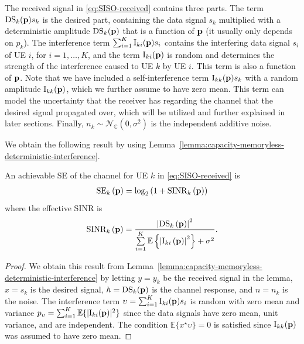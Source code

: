 The received signal in \eqref{eq:SISO-received} contains three parts. The term $\mathrm{DS}_k(\mathbf{p})s_k$ is the desired part, containing the data signal $s_k$ multiplied with a deterministic amplitude $\mathrm{DS}_k(\mathbf{p})$ that is a function of $\mathbf{p}$ (it usually only depends on $p_k$). The interference term $\sum_{i=1}^K\mathrm{I}_{ki}(\mathbf{p})s_i$ contains the interfering data signal $s_i$ of UE $i$, for $i=1,\ldots,K$, and the term $\mathrm{I}_{ki}(\mathbf{p})$ is random and determines the strength of the interference caused to UE $k$ by UE $i$. This term is also a function of $\mathbf{p}$. Note that we have included a self-interference term $\mathrm{I}_{kk} (\mathbf{p})s_k$ with a random amplitude $\mathrm{I}_{kk}(\mathbf{p})$, which we further assume to have zero mean. This term can model the uncertainty that the receiver has regarding the channel that the desired signal propagated over, which will be utilized and further explained in later sections. Finally, $n_k \sim \mathcal{N}_{\mathbb{C}}\left(0,\sigma^2\right)$ is the independent additive noise.

We obtain the following result by using Lemma~\ref{lemma:capacity-memoryless-deterministic-interference}. 

\begin{lemma} \label{lemma:generic-SINR-expression}
An achievable SE of the channel for UE $k$ in \eqref{eq:SISO-received} is 
\begin{align} \label{eq:SISO-received-SE}
\mathrm{SE}_k\left(\mathbf{p}\right)=\log_2\left(1+\mathrm{SINR}_k\left(\mathbf{p}\right)\right)
\end{align}
where the effective SINR is
\begin{align}\label{eq:SISO-received-SINR}
\mathrm{SINR}_k\left(\mathbf{p}\right)=\frac{\left|\mathrm{DS}_k\left(\mathbf{p}\right)\right|^2}{\sum\limits_{i=1}^K\mathbb{E}\left\{\left|\mathrm{I}_{ki}\left(\mathbf{p}\right)\right|^2\right\}+\sigma^2}.
\end{align}
\end{lemma}
\begin{proof}
We obtain this result from Lemma~\ref{lemma:capacity-memoryless-deterministic-interference} by letting $y=y_k$ be the received signal in the lemma, $x= s_k$ is the desired signal, $h=\mathrm{DS}_k(\mathbf{p})$ is the channel response, and $n=n_k$ is the noise. The interference term $\upsilon = \sum_{i=1}^K\mathrm{I}_{ki}(\mathbf{p})s_i$ is random with zero mean and variance  $p_{\upsilon} = \sum_{i=1}^K\mathbb{E}\{|\mathrm{I}_{ki}(\mathbf{p})|^2\}$ since the data signals have zero mean, unit variance, and are independent. The condition $\mathbb{E}\{ x^{\star} \upsilon \} = 0$ is satisfied since $\mathrm{I}_{kk}(\mathbf{p})$ was assumed to have zero mean.
\end{proof}


